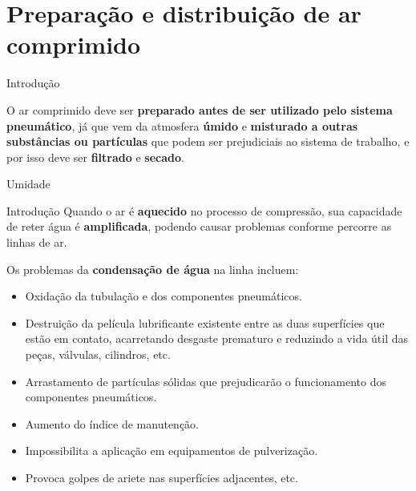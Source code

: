 \section{Preparação e distribuição de ar comprimido}

\begin{frame}{Introdução}
	\begin{block}{}
		O ar comprimido deve ser \textbf{preparado antes de ser utilizado pelo sistema pneumático}, já que vem da atmosfera \textbf{úmido} e \textbf{misturado a outras substâncias ou partículas} que podem ser prejudiciais ao sistema de trabalho, e por isso deve ser \textbf{filtrado} e \textbf{secado}.
	\end{block}
\end{frame}


\begin{frame}{Umidade}
\begin{block}{Introdução}
	Quando o ar é \textbf{aquecido} no processo de compressão, sua capacidade de reter água é \textbf{amplificada}, podendo causar problemas conforme percorre as linhas de ar.
	
	Os problemas da \textbf{condensação de água} na linha incluem:
	\begin{itemize}
		\item Oxidação da tubulação e dos componentes pneumáticos.
		\item Destruição da película lubrificante existente entre as duas
		superfícies que estão em contato, acarretando desgaste
		prematuro e reduzindo a vida útil das peças, válvulas,
		cilindros, etc.
		\item Arrastamento de partículas sólidas que prejudicarão o funcionamento dos componentes pneumáticos.
		\item Aumento do índice de manutenção.
		\item Impossibilita a aplicação em equipamentos de pulverização.
		\item Provoca golpes de ariete nas superfícies adjacentes, etc.
	\end{itemize}
\end{block}
\end{frame}


